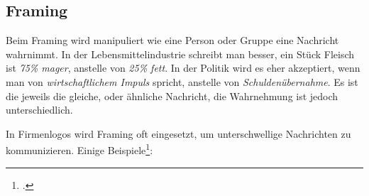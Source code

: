 \subsection{Framing}
Beim Framing wird manipuliert wie eine Person oder Gruppe eine Nachricht wahrnimmt. In der Lebensmittelindustrie schreibt man besser, ein Stück Fleisch ist \textit{75\% mager}, anstelle von \textit{25\% fett}. In der Politik wird es eher akzeptiert, wenn man von \textit{wirtschaftlichem Impuls} spricht, anstelle von \textit{Schuldenübernahme}. Es ist die jeweils die gleiche, oder ähnliche Nachricht, die Wahrnehmung ist jedoch unterschiedlich.

In Firmenlogos wird Framing oft eingesetzt, um unterschwellige Nachrichten zu kommunizieren. Einige Beispiele\footcite{Versteckte_Botschaften_in_Logos_2015-05-16}:

